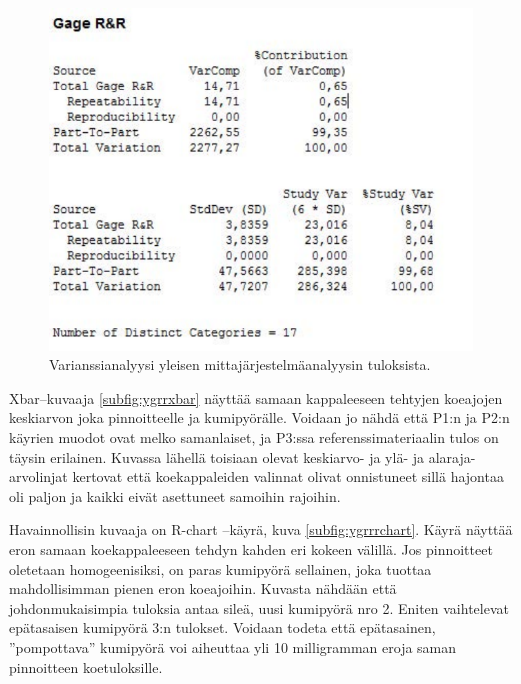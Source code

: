 \documentclass[12pt,a4paper,finnish]{tutthesis}
\begin{document}
\begin{figure}
  \begin{center}
    \includegraphics{minitabgrr}
  \end{center}
  \caption[Yleinen mittajärjestelmävarianssianalyysi]{Varianssianalyysi yleisen mittajärjestelmäanalyysin tuloksista.}
  \label{fig:minitabgrr}
\end{figure}


Xbar–kuvaaja \ref{subfig:ygrrxbar} näyttää samaan kappaleeseen tehtyjen koeajojen keskiarvon joka pinnoitteelle ja kumipyörälle.
Voidaan jo nähdä että P1:n ja P2:n käyrien muodot ovat melko samanlaiset, ja P3:ssa referenssimateriaalin tulos on täysin erilainen. Kuvassa lähellä toisiaan olevat keskiarvo- ja ylä- ja alaraja-arvolinjat kertovat että koekappaleiden valinnat olivat onnistuneet sillä hajontaa oli paljon ja kaikki eivät asettuneet samoihin rajoihin.


Havainnollisin kuvaaja on R-chart –käyrä, kuva \ref{subfig:ygrrrchart}. Käyrä näyttää eron samaan koekappaleeseen tehdyn kahden eri kokeen välillä. Jos pinnoitteet oletetaan homogeenisiksi, on paras kumipyörä sellainen, joka tuottaa mahdollisimman pienen eron koeajoihin.
Kuvasta nähdään että johdonmukaisimpia tuloksia antaa sileä, uusi kumipyörä nro 2. Eniten vaihtelevat epätasaisen kumipyörä 3:n tulokset. Voidaan todeta että epätasainen, ”pompottava” kumipyörä voi aiheuttaa yli 10 milligramman eroja saman pinnoitteen koetuloksille.
\end{document}
